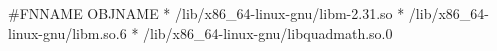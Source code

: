 #FNNAME   OBJNAME
*	/lib/x86_64-linux-gnu/libm-2.31.so
*	/lib/x86_64-linux-gnu/libm.so.6
* /lib/x86_64-linux-gnu/libquadmath.so.0